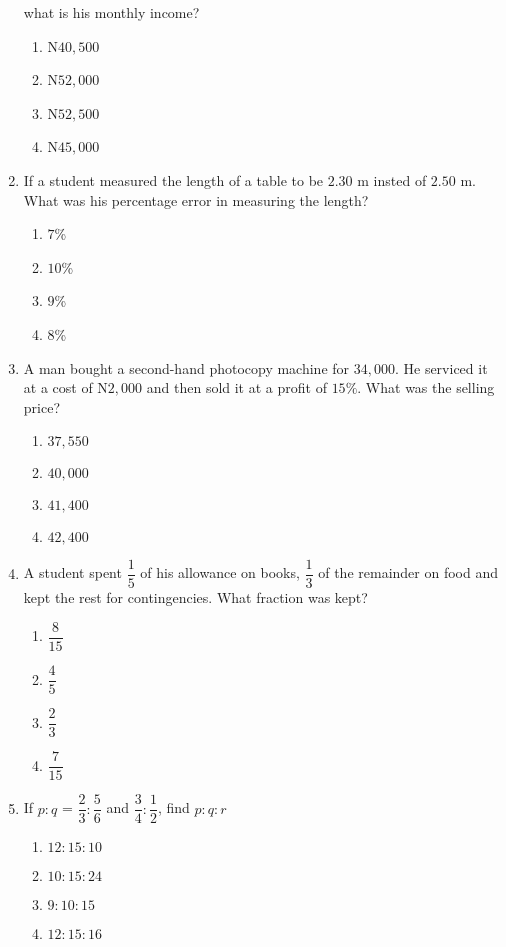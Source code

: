 \begin{multicols}{2}
\begin{enumerate}[label={\arabic*.}]
what is his monthly income? 
    \begin{enumerate}[label={\Alph*.}]
    \item N\(40,500\)
    \item N\(52,000\)
    \item N\(52,500\)
    \item N\(45,000\)
    \end{enumerate}
\item If a student measured the length of a table to be \(2.30\) m insted of \(2.50\) m. 
What was his percentage error in measuring the length?
    \begin{enumerate}[label={\Alph*.}]
    \item \(7\)\%
    \item \(10\)\%
    \item \(9\)\%
    \item \(8\)\%
    \end{enumerate}
\item A man bought a second-hand photocopy machine for \(34,000\). He serviced it at a cost of N\(2,000\) and then sold it at a profit of \(15\%\). What was the selling price? 
    \begin{enumerate}[label={\Alph*.}]
    \item \(37,550\)
    \item \(40,000\)
    \item \(41,400\)
    \item \(42,400\)
    \end{enumerate}
\item A student spent \(\dfrac{1}{5}\) of his allowance on books, \(\dfrac{1}{3}\) of the remainder on food and kept the rest for contingencies. 
What fraction was kept?
    \begin{enumerate}[label={\Alph*.}]
    \item \(\dfrac{8}{15}\)
    \item \(\dfrac{4}{5}\)
    \item \(\dfrac{2}{3}\)
    \item \(\dfrac{7}{15}\)
    \end{enumerate}
\item If \(p:q\) = \(\dfrac{2}{3}:\dfrac{5}{6}\) and \(\dfrac{3}{4}:\dfrac{1}{2}\), find \(p:q:r\)
    \begin{enumerate}[label={\Alph*.}]
    \item \(12:15:10\)
    \item \(10:15:24\)
    \item \(9:10:15\)
    \item \(12:15:16\)

\end{enumerate}
\end{enumerate}
\end{multicols}
